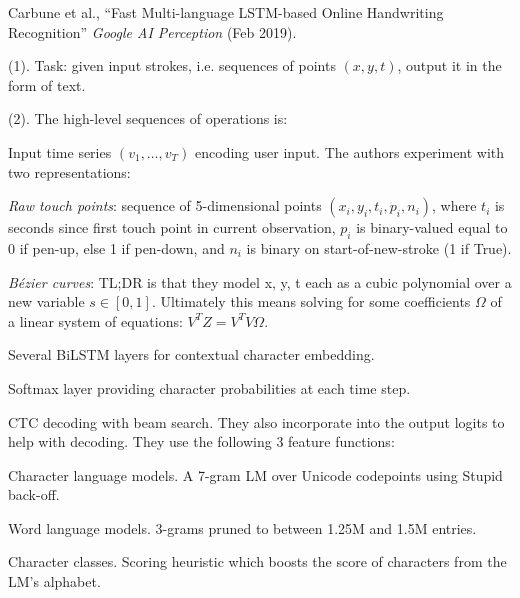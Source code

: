 \documentclass[11pt]{article}
\begin{document}

\vspace{-1em}
{\footnotesize Carbune et al., ``Fast Multi-language LSTM-based Online Handwriting Recognition'' \textit{Google AI Perception} (Feb 2019).}


 (1). Task: given input strokes, i.e. sequences of points $(x, y, t)$, output it in the form of text.

 (2). The high-level sequences of operations is:
\begin{compactenum}
	\item Input time series $(v_1, \ldots, v_T)$ encoding user input. The authors experiment with two representations:
	\begin{compactenum}
		\item \textit{Raw touch points}: sequence of 5-dimensional points $(x_i, y_i, t_i, p_i, n_i)$, where $t_i$ is seconds since first touch point in current observation, $p_i$ is binary-valued equal to 0 if pen-up, else 1 if pen-down, and $n_i$ is binary on start-of-new-stroke (1 if True). 
		\item \textit{B\'{e}zier curves}: TL;DR is that they model x, y, t each as a cubic polynomial over a new variable $s \in [0, 1]$. Ultimately this means solving for some coefficients $\Omega$ of a linear system of equations: $V^T Z = V^T V \Omega$. 
	\end{compactenum}
	
	\item Several BiLSTM layers for contextual character embedding.
	
	\item Softmax layer providing character probabilities at each time step. 
	
	\item CTC decoding with beam search. They also incorporate  into the output logits to help with decoding. They use the following 3 feature functions:
	\begin{compactenum}
		\item Character language models. A 7-gram LM over Unicode codepoints using Stupid back-off.
		
		\item Word language models. 3-grams pruned to between 1.25M and 1.5M entries.
		
		\item Character classes. Scoring heuristic which boosts the score of characters from the LM's alphabet.
	\end{compactenum}
\end{compactenum}
\end{document}

